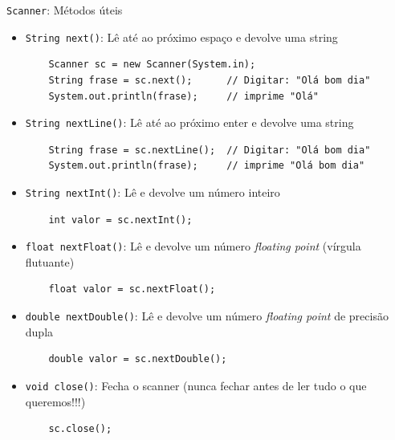 \documentclass[portuguese, aspectratio=169, xcolor=table]{beamer}
\begin{document}
\begin{frame}[fragile]{\texttt{Scanner}: Métodos úteis}
\begin{itemize}
    \item \texttt{String next()}: Lê até ao próximo espaço e devolve uma string
\begin{verbatim}
    Scanner sc = new Scanner(System.in);
    String frase = sc.next();      // Digitar: "Olá bom dia"
    System.out.println(frase);     // imprime "Olá"
\end{verbatim}

\item \texttt{String nextLine()}: Lê até ao próximo enter e devolve uma string
\begin{verbatim}
    String frase = sc.nextLine();  // Digitar: "Olá bom dia"
    System.out.println(frase);     // imprime "Olá bom dia"
\end{verbatim}

\item \texttt{String nextInt()}: Lê e devolve um número inteiro
\begin{verbatim}
    int valor = sc.nextInt();
\end{verbatim}
\item \texttt{float nextFloat()}: Lê e devolve um número \textit{floating point} (vírgula flutuante)
\begin{verbatim}
    float valor = sc.nextFloat();
\end{verbatim}
\item \texttt{double nextDouble()}: Lê e devolve um número \textit{floating point} de precisão dupla
\begin{verbatim}
    double valor = sc.nextDouble();
\end{verbatim}
\item \texttt{void close()}: Fecha o scanner (nunca fechar antes de ler tudo o que queremos!!!)
\begin{verbatim}
    sc.close();
\end{verbatim}
\end{itemize}
\end{frame}
\end{document}
